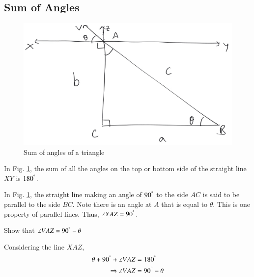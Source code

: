\subsection{Sum of Angles}
\begin{figure}[!h]
	\begin{center}
		
		\includegraphics[width=\columnwidth]{./figs/ch1_parallel_triangle}
		\vspace*{-10cm}
	\end{center}
	\caption{Sum of angles of a triangle}
	\label{ch1_parallel_triangle}	
\end{figure}

\begin{definition}
	In Fig. \ref{ch1_parallel_triangle}, the sum of all the angles on the top or bottom side of the straight line $XY$ is $180^{\degree}$.
\end{definition}

\begin{definition}
In Fig. \ref{ch1_parallel_triangle}, the straight line making an angle of $90^{\degree}$ to the side $AC$ is said to be parallel to the side $BC$. Note there is an angle at $A$ that is equal to $\theta$.  This is one property of parallel lines.  Thus, $\angle YAZ = 90^{\degree}$.
\end{definition}

\begin{problem}
	Show that $\angle VAZ = 90^{\degree} - \theta$
\end{problem}		
	\proof Considering the line $XAZ$,
	\begin{align}
	\theta + 90^{\degree} + \angle VAZ &= 180^{\degree} \\
	\Rightarrow  \angle VAZ &=  90^{\degree} - \theta
	\end{align}

